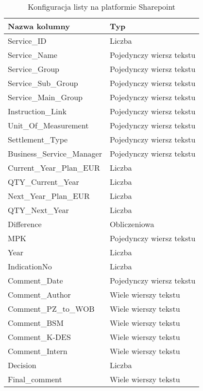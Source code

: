 \begin{table}[t]
    \centering
    \caption{Konfiguracja listy na platformie Sharepoint}
    \label{tab:SharepointList}
\begin{tabular}{|l|l|}
    \hline
    \textbf{Nazwa kolumny} & \textbf{Typ} \\ \hline
    Service\_ID & Liczba \\ \hline
    Service\_Name & Pojedynczy wiersz tekstu \\ \hline
    Service\_Group & Pojedynczy wiersz tekstu \\ \hline
    Service\_Sub\_Group & Pojedynczy wiersz tekstu \\ \hline
    Service\_Main\_Group & Pojedynczy wiersz tekstu \\ \hline
    Instruction\_Link & Pojedynczy wiersz tekstu \\ \hline
    Unit\_Of\_Measurement & Pojedynczy wiersz tekstu \\ \hline
    Settlement\_Type & Pojedynczy wiersz tekstu \\ \hline
    Business\_Service\_Manager & Pojedynczy wiersz tekstu \\ \hline
    Current\_Year\_Plan\_EUR & Liczba \\ \hline
    QTY\_Current\_Year & Liczba \\ \hline
    Next\_Year\_Plan\_EUR & Liczba \\ \hline
    QTY\_Next\_Year & Liczba \\ \hline
    Difference & Obliczeniowa \\ \hline
    MPK & Pojedynczy wiersz tekstu \\ \hline
    Year & Liczba \\ \hline
    IndicationNo & Liczba \\ \hline
    Comment\_Date & Pojedynczy wiersz tekstu \\ \hline
    Comment\_Author & Wiele wierszy tekstu \\ \hline
    Comment\_PZ\_to\_WOB & Wiele wierszy tekstu \\ \hline
    Comment\_BSM & Wiele wierszy tekstu \\ \hline
    Comment\_K-DES & Wiele wierszy tekstu \\ \hline
    Comment\_Intern & Wiele wierszy tekstu \\ \hline
    Decision & Liczba \\ \hline
    Final\_comment & Wiele wierszy tekstu \\ \hline
    \end{tabular}
\end{table}

